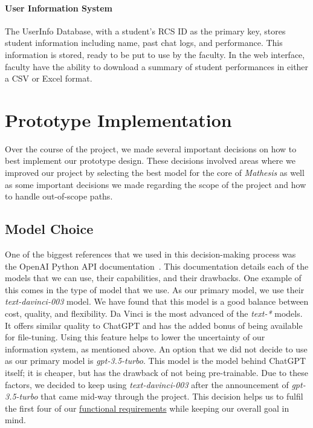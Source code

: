 \documentclass[12pt,a4paper]{article}
\begin{document}
    \paragraph{User Information System}
    The UserInfo Database, with a student's RCS ID as the primary key, stores student information
    including name, past chat logs, and performance.  This information is stored, ready to be put to
    use by the faculty.  In the web interface, faculty have the ability to download a summary of
    student performances in either a CSV or Excel format.

    \section{Prototype Implementation}

    Over the course of the project, we made several important decisions on how to best implement our
    prototype design.  These decisions involved areas where we improved our project by selecting
    the best model for the core of \textit{Mathesis} as well as some important decisions we made
    regarding the scope of the project and how to handle out-of-scope paths.

    \subsection{Model Choice}

    One of the biggest references that we used in this decision-making process was
    the OpenAI Python API documentation~\cite{openAiDocs}.  This documentation details
    each of the models that we can use, their capabilities, and their drawbacks.  One example of this
    comes in the type of model that we use.  As our primary model, we use their \textit{text-davinci-003}
    model.  We have found that this model is a good balance between cost, quality, and flexibility.
    Da Vinci is the most advanced of the \textit{text-*} models.  It offers similar quality to ChatGPT
    and has the added bonus of being available for file-tuning.  Using this feature helps to lower
    the uncertainty of our information system, as mentioned above.  An option that we did not decide to
    use as our primary model is \textit{gpt-3.5-turbo}.  This model is the model behind ChatGPT itself;
    it is cheaper, but has the drawback of not being pre-trainable.  Due to these factors, we
    decided to keep using \textit{text-davinci-003} after the announcement of \textit{gpt-3.5-turbo}
    that came mid-way through the project.  This decision helps us to fulfil the first four of our
    \hyperref[functionalReqs]{functional requirements} while keeping our overall goal in mind.
\end{document}
